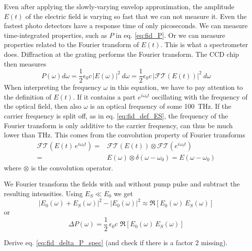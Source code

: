 Even after applying the slowly-varying envelop approximation, the amplitude $E(t)$ of the electric field is varying so fast that we can not measure it. Even the fastest photo detectors have a response time of only picoseconds. We can measure time-integrated properties, such as $P$ in eq. \ref{eq:fid_P}. Or we can measure properties related to the Fourier transform of  $E(t)$. This is what a spectrometer does. Diffraction at the grating performs the Fourier transform. The CCD chip then measures
\begin{equation}
 P (\omega) d\omega =  \frac{1}{2} \epsilon_0 c \,  \left| E(\omega) \right|^2 \ d\omega =  \frac{1}{2} \epsilon_0 c \,  \left|  \mathcal{FT} ( E(t) ) \right|^2 \ d\omega
\end{equation}
When interpreting the frequency $\omega$ in this equation, we have to pay attention to the definition of $E(t) $. If it contains a part $e^{i \omega_0 t}$ oscillating with the frequency of the optical field, then also $\omega$ is an optical frequency of some 100~THz. If the carrier frequency is split off, as in eq.  \ref{eq:fid_def_ES}, the frequency of the Fourier transform is only additive to the carrier frequency, can thus be much lower than THz. This comes from the convolution property of Fourier transforms
\begin{align}
 \mathcal{FT} \left( E(t) \, e^{i \omega_0 t} \right) 
  = &
  \mathcal{FT} \left( E(t)  \right)  \otimes
 \mathcal{FT} \left(  e^{i \omega_0 t} \right)  \\
 = &
  E(\omega) \otimes
\delta (\omega - \omega_0 ) =  
E (\omega - \omega_0 )
\end{align}
where $\otimes$ is the convolution operator. 

We  Fourier transform the fields with and without pump pulse 
and subtract the resulting intensities. Using $E_S \ll E_0$ we get
\begin{equation}
 \left| E_0(\omega) + E_S(\omega) \right|^2 -  \left| E_0(\omega)  \right|^2 \approx  \Re \left[ E_0(\omega)   \, E_S(\omega)  \right]
\end{equation}
or
\begin{equation}
\Delta P (\omega) = \frac{1}{2} \, \epsilon_0 c \, \, \Re \left[  E_0(\omega)   \, E_S(\omega)  \right] \label{eq:fid_delta_P_spec}
\end{equation}


\begin{questions}

\item Derive  eq. \ref{eq:fid_delta_P_spec} (and check if there is a factor $2$ missing).

\end{questions}
 

